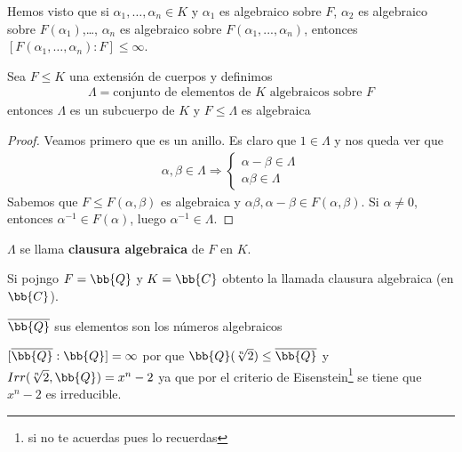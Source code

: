 \begin{observacion} %
    Hemos visto que si $\alpha_1, \dots, \alpha_n \in K$ y $\alpha_1$ es algebraico sobre $F$, $\alpha_2$ es algebraico sobre $F(\alpha_1)$,\dots, $\alpha_n$ es algebraico sobre $F(\alpha_1, ..., \alpha_n)$, entonces $[F(\alpha_1, \dots, \alpha_n):F]\leq \infty$.
\end{observacion}

\begin{coro}
    Sea $F \leq K$ una extensión de cuerpos y definimos
    \begin{gather*}
        \Lambda = \text{conjunto de elementos de }K\text{ algebraicos sobre }F
    \end{gather*}
    entonces $\Lambda$ es un subcuerpo de $K$ y $F\leq \Lambda$ es algebraica
    \begin{proof}
        Veamos primero que es un anillo. Es claro que $1\in \Lambda$ y nos queda ver que
        \begin{gather*}
            \alpha, \beta \in \Lambda \Rightarrow \left\{
            \begin{array}{l}
                \alpha - \beta \in \Lambda\\
                \alpha\beta \in \Lambda
            \end{array}
            \right.
        \end{gather*}
        Sabemos que $F\leq F(\alpha, \beta)$ es algebraica y $\alpha\beta, \alpha - \beta \in F(\alpha, \beta)$.
        Si $\alpha\neq 0$, entonces $\alpha^{-1}\in F(\alpha)$, luego $\alpha^{-1}\in \Lambda$.
    \end{proof}
\end{coro}

\begin{notacion}
    $\Lambda$ se llama \textbf{clausura algebraica} de $F$ en $K$.
\end{notacion}

\begin{ejemplo}
    Si pojngo $F=\bb{Q}$ y $K=\bb{C}$ obtento la llamada clausura algebraica (en $\bb{C}$).
\end{ejemplo}

\begin{notacion}
    $\overline{\bb{Q}}$ sus elementos son los números algebraicos
\end{notacion}

\begin{ejemplo}
    $[\overline{\bb{Q}} : \bb{Q}]= \infty$ por que $\bb{Q}(\sqrt[n]{2})\leq \overline{\bb{Q}}$ y $Irr(\sqrt[n]{2}, \bb{Q}) = x^n -2$ ya que por el criterio de Eisenstein\footnote{si no te acuerdas pues lo recuerdas} se tiene que $x^n -2$ es irreducible.
\end{ejemplo}